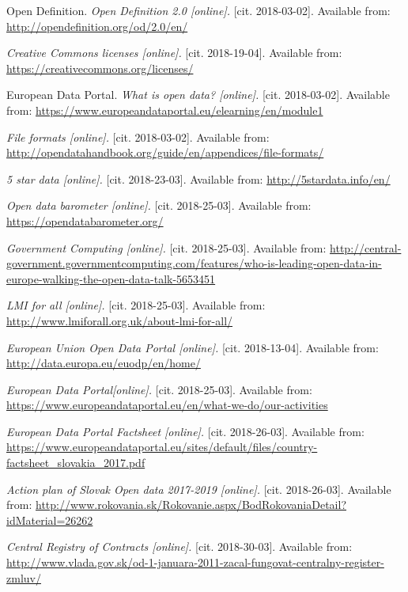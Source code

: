 \documentclass[thesis=B,english]{FITthesis}[2012/06/26]
\begin{document}
{\begin{thebibliography}{9}
Open Definition.
\textit{Open Definition 2.0 [online].}
[cit. 2018-03-02]. Available from: \url{http://opendefinition.org/od/2.0/en/} 

\textit{Creative Commons licenses [online].}
[cit. 2018-19-04]. Available from: \url{https://creativecommons.org/licenses/}

European Data Portal.
\textit{What is open data? [online].}
[cit. 2018-03-02]. Available from: \url{https://www.europeandataportal.eu/elearning/en/module1} 

\textit{File formats [online].}
[cit. 2018-03-02]. Available from: \url{http://opendatahandbook.org/guide/en/appendices/file-formats/} 

\textit{5 star data [online].}
[cit. 2018-23-03]. Available from: \url{http://5stardata.info/en/} 

\textit{Open data barometer [online].}
[cit. 2018-25-03]. Available from: \url{https://opendatabarometer.org/}

\textit{Government Computing [online].}
[cit. 2018-25-03]. Available from: \url{http://central-government.governmentcomputing.com/features/who-is-leading-open-data-in-europe-walking-the-open-data-talk-5653451}

\textit{LMI for all [online].}
[cit. 2018-25-03]. Available from: \url{http://www.lmiforall.org.uk/about-lmi-for-all/}

\textit{European Union Open Data Portal [online].}
[cit. 2018-13-04]. Available from: \url{http://data.europa.eu/euodp/en/home/}

\textit{European Data Portal[online].}
[cit. 2018-25-03]. Available from: \url{https://www.europeandataportal.eu/en/what-we-do/our-activities}

\textit{European Data Portal Factsheet [online].}
[cit. 2018-26-03]. Available from: \url{https://www.europeandataportal.eu/sites/default/files/country-factsheet_slovakia_2017.pdf}

\textit{Action plan of Slovak Open data 2017-2019 [online].}
[cit. 2018-26-03]. Available from: \url{http://www.rokovania.sk/Rokovanie.aspx/BodRokovaniaDetail?idMaterial=26262}

\textit{Central Registry of Contracts [online].}
[cit. 2018-30-03]. Available from: \url{http://www.vlada.gov.sk/od-1-januara-2011-zacal-fungovat-centralny-register-zmluv/}


\end{thebibliography}}
\end{document}
